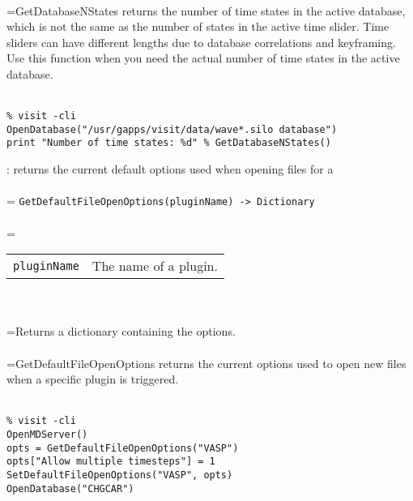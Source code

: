 \documentclass[10pt,a4paper]{report}
\begin{document}
 \\ 
\hangindent=\parindent GetDatabaseNStates returns the number of time states in the active database, which is not the same as the number of states in the active time slider. Time sliders can have different lengths due to database correlations and keyframing. Use this function when you need the actual number of time states in the active database. \\[-3mm] 

\\[-6mm]
\begin{verbatim}% visit -cli
OpenDatabase("/usr/gapps/visit/data/wave*.silo database")
print "Number of time states: %d" % GetDatabaseNStates()
\end{verbatim}
\newpage


{}
: returns the current default options used when opening files for a\\[-3mm]

 \\ 
\hangindent=\parindent 
\verb!GetDefaultFileOpenOptions(pluginName) -> Dictionary!\\ [-3mm]

 \\ 
\hangindent=\parindent 
\begin{tabular}{ll}
\verb!pluginName! & The name of a plugin. \\
\end{tabular} \\[-2mm]


 \\ 
\hangindent=\parindent Returns a dictionary containing the options. \\[-3mm] 

 \\ 
\hangindent=\parindent GetDefaultFileOpenOptions returns the current options used to open new files when a specific plugin is triggered. \\[-3mm] 

\\[-6mm]
\begin{verbatim}% visit -cli
OpenMDServer()
opts = GetDefaultFileOpenOptions("VASP")
opts["Allow multiple timesteps"] = 1
SetDefaultFileOpenOptions("VASP", opts)
OpenDatabase("CHGCAR")
\end{verbatim}
\newpage
\end{document}
